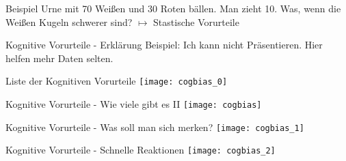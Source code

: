 \begin{frame}[c]{Beispiel}
    \pause
    Urne mit 70 Weißen und 30 Roten bällen. \newline
    \newline \pause
    Man zieht 10. \newline
    \newline \pause
    Was, wenn die Weißen Kugeln schwerer sind? \newline
    \newline \pause
    $\mapsto$ Stastische Vorurteile
\end{frame}


\begin{frame}[c]{Kognitive Vorurteile - Erklärung}
    \pause
    Beispiel: Ich kann nicht Präsentieren. \newline
    \newline \pause
    Hier helfen mehr Daten selten.
\end{frame}




\begin{frame}[c]{Liste der Kognitiven Vorurteile}
    \centering
    \texttt{[image: cogbias\_0]}
\end{frame}

\begin{frame}[c]{Kognitive Vorurteile - Wie viele gibt es II}
    \centering
    \texttt{[image: cogbias]}
\end{frame}

\begin{frame}[c]{Kognitive Vorurteile - Was soll man sich merken?}
    \centering
    \texttt{[image: cogbias\_1]}
\end{frame}

\begin{frame}[c]{Kognitive Vorurteile - Schnelle Reaktionen}
    \centering
    \texttt{[image: cogbias\_2]}
\end{frame}

